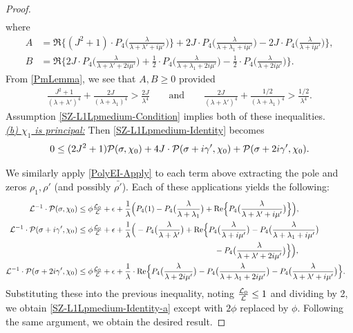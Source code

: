 \documentclass[12pt,psamsfonts]{amsart}
\theoremstyle{definition}
\theoremstyle{remark}
\numberwithin{equation}{section}
\begin{document}
\begin{proof}
\begin{equation}
\begin{aligned}
\end{aligned}
\end{equation}
where
\begin{align*}
A & = \Re\big\{ (J^2 + 1)  \cdot  P_4\big( \frac{\lambda}{\lambda+\lambda' + i\mu'} \big) \big\}  +  2J \cdot P_4\big( \frac{\lambda}{\lambda+\lambda_1+i\mu'} \big) - 2J \cdot P_4\big( \frac{\lambda}{\lambda +i\mu'} \big) \Big\}, \\
B & =  \Re\big\{ 2J \cdot  P_4\big( \frac{\lambda}{\lambda+\lambda' + 2i\mu'} \big)   +  \frac{1}{2} \cdot  P_4\big( \frac{\lambda}{\lambda+\lambda_1+2i\mu'} \big)  - \frac{1}{2} \cdot P_4\big( \frac{\lambda}{\lambda +2i\mu'} \big) \Big\}.
\end{align*}
From \cref{PmLemma}, we see that $A,B \geq 0$ provided
\begin{align*}
\frac{J^2+1}{(\lambda+\lambda')^4} + \frac{2J}{(\lambda+\lambda_1)^4} > \frac{2J}{\lambda^4}  \qquad \text{and} \qquad \frac{2J}{(\lambda+\lambda')^4} + \frac{1/2}{(\lambda+\lambda_1)^4} > \frac{1/2}{\lambda^4}.
\end{align*}
Assumption \eqref{SZ-L1Lpmedium-Condition}  implies both of these inequalities.  \\

\noindent
\underline{\emph{(b) $\chi_1$ is principal:}} Then \eqref{SZ-L1Lpmedium-Identity} becomes
\[
0 \leq (2J^2+ 1) \mathcal{P}(\sigma, \chi_0) + 4J \cdot  \mathcal{P}(\sigma+i\gamma', \chi_0)  + \mathcal{P}(\sigma+2i\gamma', \chi_0). 
\]

We similarly apply \cref{PolyEI-Apply} to each term above extracting the pole and zeros $\rho_1,\rho'$ (and possibly $\bar{\rho'}$). Each of these applications yields the following:
\begin{align*}
\mathcal{L}^{-1} \cdot \mathcal{P}(\sigma, \chi_0) & \leq  \phi \tfrac{\mathcal{L}_0}{\mathcal{L}} + \epsilon + \frac{1}{\lambda} \Big(  P_4(1) - P_4\big( \frac{\lambda}{\lambda+\lambda_1} \big)  + \mathrm{Re}\Big\{ P_4\big( \frac{\lambda}{\lambda+\lambda' + i\mu'} \big) \Big\}  \Big), \\
\mathcal{L}^{-1} \cdot \mathcal{P}(\sigma+i\gamma', \chi_0) & \leq  \phi \tfrac{\mathcal{L}_0}{\mathcal{L}} + \epsilon + \frac{1}{\lambda} \Big( - P_4\big( \frac{\lambda}{\lambda+\lambda'} \big)    +   \mathrm{Re}\Big\{ P_4\big( \frac{\lambda}{\lambda +i\mu'} \big) - P_4\big( \frac{\lambda}{\lambda+\lambda_1+i\mu'} \big) \\
& \hspace{2.4in} - P_4\big( \frac{\lambda}{\lambda+\lambda'+2i\mu'} \big) \Big\} \Big),  & \\
\mathcal{L}^{-1} \cdot \mathcal{P}(\sigma+2i\gamma', \chi_0) & \leq \phi \tfrac{\mathcal{L}_0}{\mathcal{L}} + \epsilon  + \frac{1}{\lambda} \cdot  \mathrm{Re}\Big\{ P_4\big( \frac{\lambda}{\lambda +2i\mu'} \big) - P_4\big( \frac{\lambda}{\lambda+\lambda_1+2i\mu'} \big)   - P_4\big( \frac{\lambda}{\lambda+\lambda' + i\mu'} \big) \Big\}.
\end{align*}
Substituting these into the previous inequality, noting $\frac{\mathcal{L}_0}{\mathcal{L}} \leq 1$ and dividing by 2, we obtain  \eqref{SZ-L1Lpmedium-Identity-a} except with $2\phi$ replaced by $\phi$. Following the same argument, we obtain the desired result. 
\end{proof}
\end{document}
